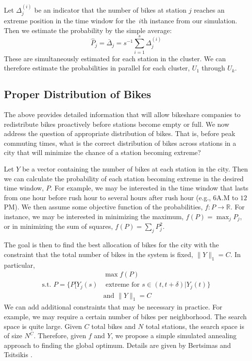 \documentclass{acm_proc_article-sp}
\begin{document}
Let $\Delta^{(i)}_j$ be an indicator that the number of bikes at station $j$ reaches an extreme position in the time window for the~$i$th instance from our simulation.  Then we estimate the probability by the simple average:
\begin{equation*}
\hat{P}_j = \bar{\Delta}_j = s^{-1} \sum_{i=1}^s \Delta^{(i)}_j
\end{equation*}
\noindent  These are simultaneously estimated for each station in the cluster.  We can therefore estimate the probabilities in parallel for each cluster, $U_1$ through $U_k$.

\subsection{Proper Distribution of Bikes}

The above provides detailed information that will allow bikeshare companies to redistribute bikes proactively before stations become empty or full.  We now address the question of appropriate distribution of bikes.  That is, before peak commuting times, what is the correct distribution of bikes across stations in a city that will minimize the chance of a station becoming extreme? 

Let $Y$ be a vector containing the number of bikes at each station in the city.  Then we can calculate the probability of each station becoming extreme in the desired time window, $P$.  For example, we may be interested in the time window that lasts from one hour before rush hour to several hours after rush hour (e.g., $6$A.M to $12$PM).  We then assume some objective function of the probabilities, $f: P \rightarrow \mathbb{R}$.  For instance, we may be interested in minimizing the maximum, $f(P) = \max_j P_j$, or in minimizing the sum of squares, $f(P) = \sum_j P_j^2$.  

The goal is then to find the best allocation of bikes for the city with the constraint that the total number of bikes in the system is fixed, $\| Y\|_1 = C$.  In particular,
\begin{align*}
&\max f (P) \\
\text{s.t. } P = \{ P[ Y_j(s) &\text{ extreme for } s \in (t,t+\delta) | Y_j (t) \} \\
&\text{and } \| Y \|_1 = C
\end{align*}
We can add additional constraints that may be necessary in practice.  For example, we may require a certain number of bikes per neighborhood.  The search space is quite large.  Given $C$ total bikes and $N$ total stations, the search space is of size $N^C$.  Therefore, given $f$ and $Y$, we propose a simple simulated annealing approach to finding the global optimum.  Details are given by Bertsimas and Tsitsikis \cite{bertsimas:simann}.
\end{document}
